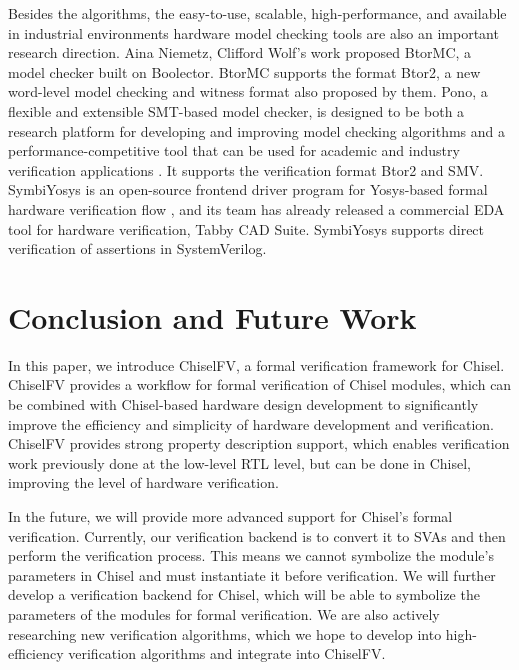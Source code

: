 \documentclass[conference]{IEEEtran}
\theoremstyle{definition}
\begin{document}
Besides the algorithms, the easy-to-use, scalable, high-performance, and available in industrial environments hardware model checking tools are also an important research direction. Aina Niemetz, Clifford Wolf's work \cite{niemetz2018btor2} proposed BtorMC, a model checker built on Boolector. BtorMC supports the format Btor2, a new word-level model checking and witness format also proposed by them. Pono, a flexible and extensible SMT-based model checker, is designed to be both a research platform for developing and improving model checking algorithms and a performance-competitive tool that can be used for academic and industry verification applications \cite{mann2021pono}. It supports the verification format Btor2 and SMV. SymbiYosys is an open-source frontend driver program for Yosys-based formal hardware verification flow \cite{SymbiYosys}, and its team has already released a commercial EDA tool for hardware verification, Tabby CAD Suite. SymbiYosys supports direct verification of assertions in SystemVerilog.

\section{Conclusion and Future Work}

In this paper, we introduce ChiselFV, a formal verification framework for Chisel. ChiselFV provides a workflow for formal verification of Chisel modules, which can be combined with Chisel-based hardware design development to significantly improve the efficiency and simplicity of hardware development and verification. ChiselFV provides strong property description support, which enables verification work previously done at the low-level RTL level, but can be done in Chisel, improving the level of hardware verification.

In the future, we will provide more advanced support for Chisel's formal verification. Currently, our verification backend is to convert it to SVAs and then perform the verification process. This means we cannot symbolize the module's parameters in Chisel and must instantiate it before verification. We will further develop a verification backend for Chisel, which will be able to symbolize the parameters of the modules for formal verification. We are also actively researching new verification algorithms, which we hope to develop into high-efficiency verification algorithms and integrate into ChiselFV.
\end{document}
